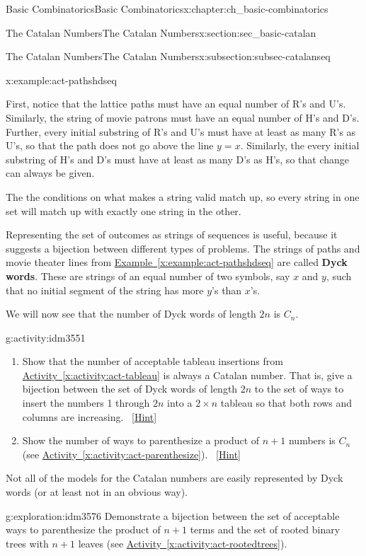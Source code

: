 \documentclass[oneside,10pt,]{book}
\newcommand{\terminology}[1]{\textbf{#1}}
\numberwithin{equation}{chapter}
\begin{document}
\begin{chapterptx}{Basic Combinatorics}{}{Basic Combinatorics}{}{}{x:chapter:ch_basic-combinatorics}
\begin{sectionptx}{The Catalan Numbers}{}{The Catalan Numbers}{}{}{x:section:sec_basic-catalan}
\begin{subsectionptx}{The Catalan Numbers}{}{The Catalan Numbers}{}{}{x:subsection:subsec-catalanseq}
\begin{example}{}{x:example:act-pathshdseq}
\par
First, notice that the lattice paths must have an equal number of R's and U's.  Similarly, the string of movie patrons must have an equal number of H's and D's. Further, every initial substring of R's and U's must have at least as many R's as U's, so that the path does not go above the line \(y=x\).  Similarly, the every initial substring of H's and D's must have at least as many D's as H's, so that change can always be given.%
\par
The the conditions on what makes a string valid match up, so every string in one set will match up with exactly one string in the other.%
\end{example}
Representing the set of outcomes as strings of sequences is useful, because it suggests a bijection between different types of problems.  The strings of paths and movie theater lines from \hyperref[x:example:act-pathshdseq]{Example~\ref{x:example:act-pathshdseq}} are called \terminology{Dyck words}.  These are strings of an equal number of two symbols, say \(x\) and \(y\), such that no initial segment of the string has more \(y\)'s than \(x\)'s.%
\par
We will now see that the number of Dyck words of length \(2n\) is \(C_n\).%
\begin{activity}{}{g:activity:idm3551}%
\begin{enumerate}[font=\bfseries,label=(\alph*),ref=\alph*]
\item{}Show that the number of acceptable tableau insertions from \hyperref[x:activity:act-tableau]{Activity~\ref{x:activity:act-tableau}} is always a Catalan number.  That is, give a bijection between the set of Dyck words of length \(2n\) to the set of ways to insert the numbers 1 through \(2n\) into a \(2\times n\) tableau so that both rows and columns are increasing.%
\qquad~\hfill{\tiny\hyperlink{g:hint:idm3559-back}{[Hint]}}\item{}Show the number of ways to parenthesize a product of \(n+1\) numbers is \(C_n\) (see \hyperref[x:activity:act-parenthesize]{Activity~\ref{x:activity:act-parenthesize}}).%
\qquad~\hfill{\tiny\hyperlink{g:hint:idm3567-back}{[Hint]}}\end{enumerate}
\end{activity}
Not all of the models for the Catalan numbers are easily represented by Dyck words (or at least not in an obvious way).%
\begin{exploration}{}{g:exploration:idm3576}%
Demonstrate a bijection between the set of acceptable ways to parenthesize the product of \(n+1\) terms and the set of rooted binary trees with \(n+1\) leaves (see \hyperref[x:activity:act-rootedtrees]{Activity~\ref{x:activity:act-rootedtrees}}).%

\end{exploration}
\end{subsectionptx}
\end{sectionptx}
\end{chapterptx}
\end{document}

